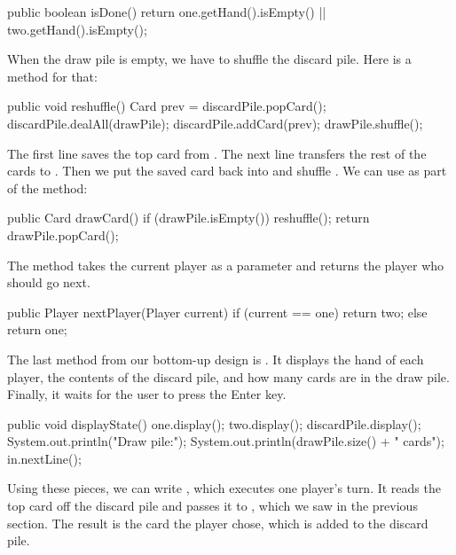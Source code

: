 \begin{code}
public boolean isDone() {
    return one.getHand().isEmpty() || two.getHand().isEmpty();
}
\end{code}

When the draw pile is empty, we have to shuffle the discard pile.
Here is a method for that:

\begin{code}
public void reshuffle() {
    Card prev = discardPile.popCard();
    discardPile.dealAll(drawPile);
    discardPile.addCard(prev);
    drawPile.shuffle();
}
\end{code}

The first line saves the top card from .
The next line transfers the rest of the cards to .
Then we put the saved card back into  and shuffle .
We can use  as part of the  method:

\begin{code}
public Card drawCard() {
    if (drawPile.isEmpty()) {
        reshuffle();
    }
    return drawPile.popCard();
}
\end{code}

The  method takes the current player as a parameter and returns the player who should go next.

\begin{code}
public Player nextPlayer(Player current) {
    if (current == one) {
        return two;
    } else {
        return one;
    }
}
\end{code}

The last method from our bottom-up design is .
It displays the hand of each player, the contents of the discard pile, and how many cards are in the draw pile.
Finally, it waits for the user to press the {\sf Enter} key.


\begin{code}
public void displayState() {
    one.display();
    two.display();
    discardPile.display();
    System.out.println("Draw pile:");
    System.out.println(drawPile.size() + " cards");
    in.nextLine();
}
\end{code}

Using these pieces, we can write , which executes one player's turn.
It reads the top card off the discard pile and passes it to , which we saw in the previous section.
The result is the card the player chose, which is added to the discard pile.

